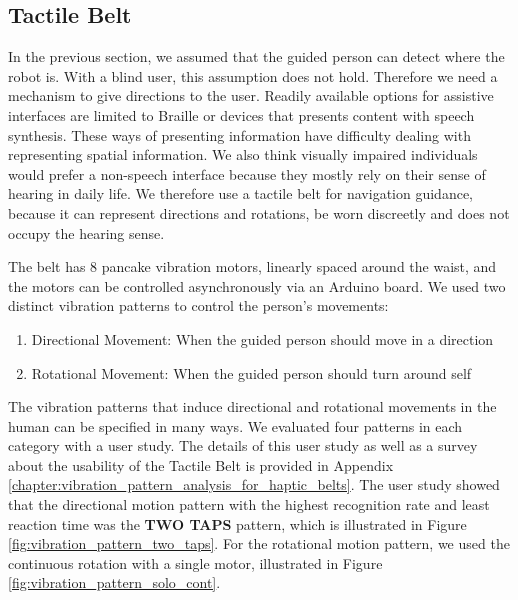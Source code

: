 
\subsection{Tactile Belt}

In the previous section, we assumed that the guided person can detect where the robot is. With a blind user, this assumption does not hold. Therefore we need a mechanism to give directions to the user. Readily available options for assistive interfaces are limited to Braille or devices that presents content with speech synthesis. These ways of presenting information have difficulty dealing with representing spatial information. We also think visually impaired individuals would prefer a non-speech interface because they mostly rely on their sense of hearing in daily life. We therefore use a tactile belt for navigation guidance, because it can represent directions and rotations, be worn discreetly and does not occupy the hearing sense.

The belt has 8 pancake vibration motors, linearly spaced around the waist, and the motors can be controlled asynchronously via an Arduino board. We used two distinct vibration patterns to control the person's movements:

\begin{enumerate}
\item Directional Movement: When the guided person should move in a direction
\item Rotational Movement: When the guided person should turn around self
\end{enumerate}

The vibration patterns that induce directional and rotational movements in the human can be specified in many ways. We evaluated four patterns in each category with a user study. The details of this user study as well as a survey about the usability of the Tactile Belt is provided in Appendix \ref{chapter:vibration_pattern_analysis_for_haptic_belts}. The user study showed that the directional motion pattern with the highest recognition rate and least reaction time was the \textbf{TWO TAPS} pattern, which is illustrated in Figure \ref{fig:vibration_pattern_two_taps}. For the rotational motion pattern, we used the continuous rotation with a single motor, illustrated in Figure \ref{fig:vibration_pattern_solo_cont}. 

